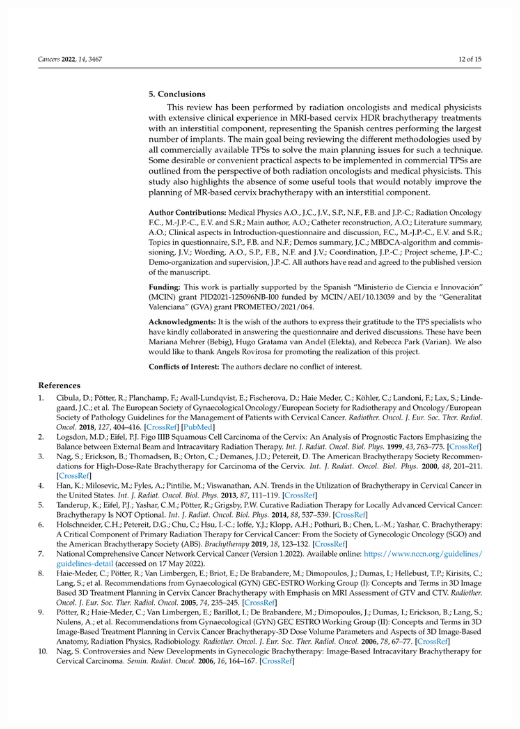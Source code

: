 \documentclass[
  a4paper,
]{scrreprt}
\begin{document}
\includegraphics{articulos/cancers/cancers-12.png}
\end{document}
